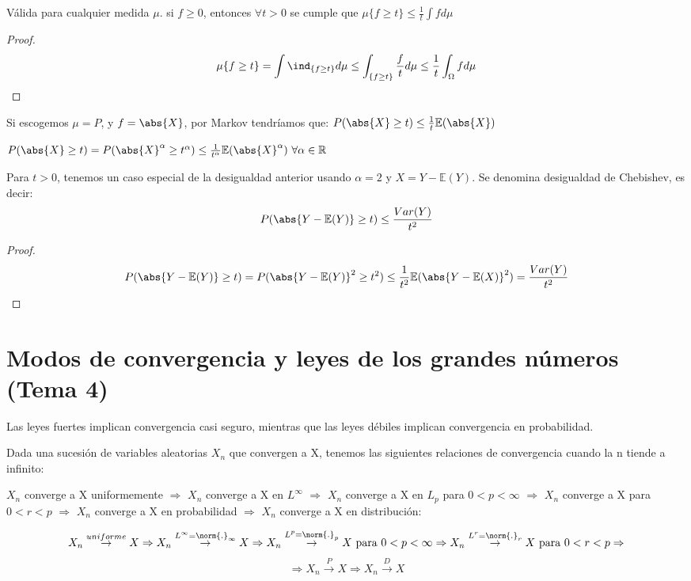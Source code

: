 \documentclass{apuntes}
\begin{document}
\begin{defn}
Válida para cualquier medida $\mu$. si $f \geq 0$, entonces $\forall t > 0$ se cumple que $\mu\{f \geq t\} \leq \frac{1}{t}\int f d\mu$

\begin{proof}
\[
\mu\{f \geq t\} = \int \ind_{\{f \geq t\}} d\mu \leq \int_{\{f \geq t\}} \frac{f}{t} d\mu \leq \frac{1}{t}\int_{\Omega}f d\mu
\]
\end{proof}

Si escogemos $\mu=P$, y $f=\abs{X}$, por Markov tendríamos que: $P(\abs{X}\geq t) \leq \frac{1}{t} \mathbb{E}(\abs{X})$
\end{defn}

\obs $P(\abs{X}\geq t) = P(\abs{X}^{\alpha}\geq t^{\alpha}) \leq \frac{1}{t^{\alpha}} \mathbb{E}(\abs{X}^{\alpha}) \text{ } \forall \alpha \in \mathbb{R}$

\obs Para $t>0$, tenemos un caso especial de la desigualdad anterior usando $\alpha=2$ y $X=Y-\mathbb{E}(Y)$. Se denomina desigualdad de Chebishev, es decir:
\[
P(\abs{Y-\mathbb{E}(Y)}\geq t) \leq \frac{Var(Y)}{t^2}
\]
\begin{proof}
\[
P(\abs{Y-\mathbb{E}(Y)}\geq t) = P(\abs{Y-\mathbb{E}(Y)}^2\geq t^2) \leq \frac{1}{t^2}\mathbb{E}(\abs{Y-\mathbb{E}(X)}^2) = \frac{Var(Y)}{t^2}
\]
\end{proof}


\chapter{Modos de convergencia y leyes de los grandes números (Tema 4)}
Las leyes fuertes implican convergencia casi seguro, mientras que las leyes débiles implican convergencia en probabilidad.

Dada una sucesión de variables aleatorias $X_n$ que convergen a X, tenemos las siguientes relaciones de convergencia cuando la n tiende a infinito:

$X_n$ converge a X uniformemente  $\Rightarrow$ $X_n$ converge a X en $L^{\infty}$  $\Rightarrow$ $X_n$ converge a X en $L_p$ para $0<p<\infty$  $\Rightarrow$ $X_n$ converge a X para $0<r<p$  $\Rightarrow$ $X_n$ converge a X en probabilidad  $\Rightarrow$ $X_n$ converge a X en distribución:

\[
X_n \stackrel{uniforme}{\rightarrow} X \Rightarrow X_n \stackrel{L^{\infty}=\norm{.}_{\infty}}{\rightarrow} X \Rightarrow X_n \stackrel{L^p=\norm{.}_p}{\rightarrow} X \text{ para } 0<p<\infty \Rightarrow  X_n \stackrel{L^r=\norm{.}_r}{\rightarrow} X \text{ para } 0<r<p \Rightarrow
\]
\[
\Rightarrow X_n \stackrel{P}{\rightarrow} X \Rightarrow X_n \stackrel{D}{\rightarrow} X
\]
\end{document}
